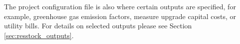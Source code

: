 


The project configuration file is also where certain outputs are specified, for example, greenhouse gas emission factors, measure upgrade capital costs, or utility bills. For details on selected outputs please see Section \ref{sec:resstock_outputs}.

